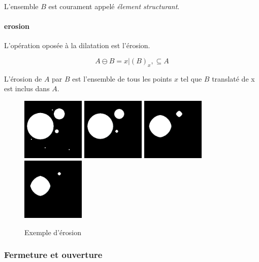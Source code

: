 {L'ensemble $B$ est courament appelé \emph{élement structurant}.

\paragraph{erosion}

L'opération oposée à la dilatation est l'érosion.

\begin{equation}
  A \ominus B = {x|(B)_x, \subseteq A}
\end{equation}

L'érosion de $A$ par $B$ est l'ensemble de tous les points $x$ tel que $B$ translaté de x est inclus dans $A$. 

\begin{figure}
  \centering
  \includegraphics[height=3cm]{Images/morpho_init.png}
  \includegraphics[height=3cm]{Images/morpho_erode_k5.png}
  \includegraphics[height=3cm]{Images/morpho_erode_k21.png}
  \includegraphics[height=3cm]{Images/morpho_erode_k31.png}
  \label{fig:morpho_erosion}
  \caption{Exemple d'érosion}
\end{figure}

\subsubsection{Fermeture et ouverture}

}
